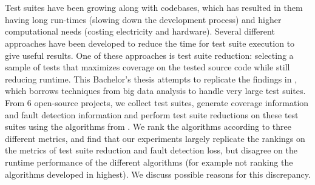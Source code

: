 \chapter{\abstractname}

Test suites have been growing along with codebases, which has resulted
in them having long run-times (slowing down the development process) and
higher computational needs (costing electricity and hardware). Several
different approaches have been developed to reduce the time for test
suite execution to give useful results. One of these approaches is test
suite reduction: selecting a sample of tests that maximizes coverage
on the tested source code while still reducing runtime. This Bachelor's
thesis attempts to replicate the findings in \cite{cruciani2019scalable},
which borrows techniques from big data analysis to handle very large
test suites. From 6 open-source projects, we collect test suites,
generate coverage information and fault detection information and
perform test suite reductions on these test suites using the
algorithms from \cite{cruciani2019scalable}. We rank the algorithms
according to three different metrics, and find that our experiments
largely replicate the rankings on the metrics of test suite reduction
and fault detection loss, but disagree on the runtime performance of the
different algorithms (for example not ranking the algorithms developed
in \cite{cruciani2019scalable} highest). We discuss possible reasons
for this discrepancy.
